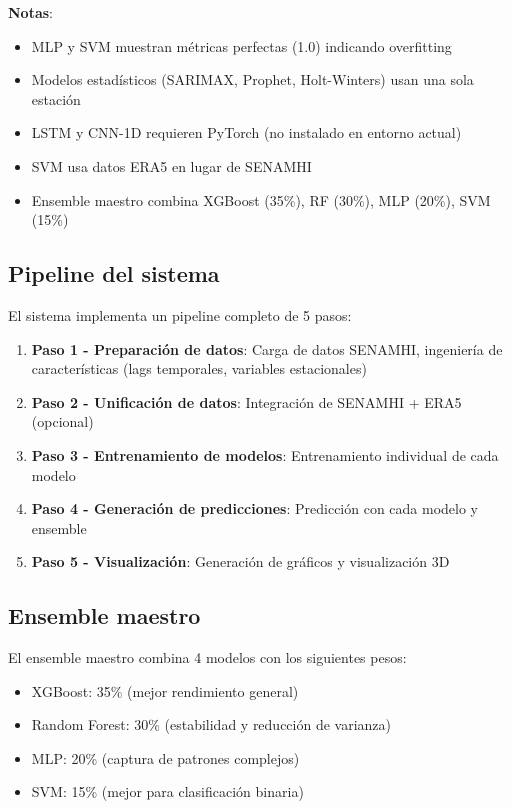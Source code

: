 \documentclass[11pt, a4paper]{article}
\begin{document}
\textbf{Notas}:
\begin{itemize}
    \item MLP y SVM muestran métricas perfectas (1.0) indicando overfitting
    \item Modelos estadísticos (SARIMAX, Prophet, Holt-Winters) usan una sola estación
    \item LSTM y CNN-1D requieren PyTorch (no instalado en entorno actual)
    \item SVM usa datos ERA5 en lugar de SENAMHI
    \item Ensemble maestro combina XGBoost (35\%), RF (30\%), MLP (20\%), SVM (15\%)
\end{itemize}

\subsection{Pipeline del sistema}

El sistema implementa un pipeline completo de 5 pasos:

\begin{enumerate}
    \item \textbf{Paso 1 - Preparación de datos}: Carga de datos SENAMHI, ingeniería de características (lags temporales, variables estacionales)
    \item \textbf{Paso 2 - Unificación de datos}: Integración de SENAMHI + ERA5 (opcional)
    \item \textbf{Paso 3 - Entrenamiento de modelos}: Entrenamiento individual de cada modelo
    \item \textbf{Paso 4 - Generación de predicciones}: Predicción con cada modelo y ensemble
    \item \textbf{Paso 5 - Visualización}: Generación de gráficos y visualización 3D
\end{enumerate}

\subsection{Ensemble maestro}

El ensemble maestro combina 4 modelos con los siguientes pesos:
\begin{itemize}
    \item XGBoost: 35\% (mejor rendimiento general)
    \item Random Forest: 30\% (estabilidad y reducción de varianza)
    \item MLP: 20\% (captura de patrones complejos)
    \item SVM: 15\% (mejor para clasificación binaria)
\end{itemize}
\end{document}
